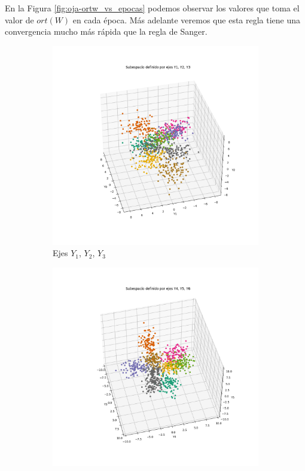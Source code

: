 \documentclass[a4paper,10pt]{article}
\begin{document}
En la Figura \ref{fig:oja-ortw_vs_epocas} podemos observar los valores que
toma el valor de $ort(W)$ en cada época. Más adelante veremos que esta regla
tiene una convergencia mucho más rápida que la regla de Sanger.

\begin{figure}[H]
	\begin{subfigure}{.5\textwidth}
		\centering
		\includegraphics[width=\textwidth]{imgs/oja-subespacio-y1_y2_y3.png}
		\caption{Ejes $Y_1$, $Y_2$, $Y_3$}
		\label{fig:oja-1er_subesp}
	\end{subfigure}%
	\begin{subfigure}{.5\textwidth}
		\centering
		\includegraphics[width=\textwidth]{imgs/oja-subespacio-y4_y5_y6.png}

\end{subfigure}
\end{figure}
\end{document}

